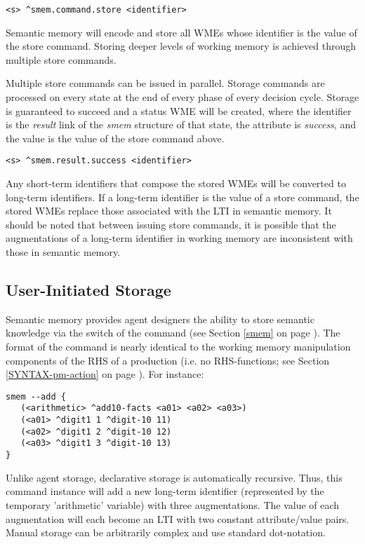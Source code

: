 \begin{verbatim}
<s> ^smem.command.store <identifier>
\end{verbatim}

Semantic memory will encode and store all WMEs whose identifier is the value of the store command.  
Storing deeper levels of working memory is achieved through multiple store commands.

Multiple store commands can be issued in parallel.  
Storage commands are processed on every state at the end of every phase of every decision cycle.  
Storage is guaranteed to succeed and a status WME will be created, where the identifier is the \emph{result} link of the \emph{smem} structure of that state, the attribute is \emph{success}, and the value is the value of the store command above.

\begin{verbatim}
<s> ^smem.result.success <identifier>
\end{verbatim}

Any short-term identifiers that compose the stored WMEs will be converted to long-term identifiers. 
If a long-term identifier is the value of a store command, the stored WMEs replace those associated with the LTI in semantic memory. 
It should be noted that between issuing store commands, it is possible that the augmentations of a long-term identifier in working memory are inconsistent with those in semantic memory.

\subsection{User-Initiated Storage}
Semantic memory provides agent designers the ability to store semantic knowledge via the  switch of the  command (see Section \ref{smem} on page \pageref{smem}).  
The format of the command is nearly identical to the working memory manipulation components of the RHS of a production (i.e. no RHS-functions; see Section \ref{SYNTAX-pm-action} on page \pageref{SYNTAX-pm-action}).  
For instance:

\begin{verbatim}
smem --add {
   (<arithmetic> ^add10-facts <a01> <a02> <a03>)
   (<a01> ^digit1 1 ^digit-10 11)
   (<a02> ^digit1 2 ^digit-10 12)
   (<a03> ^digit1 3 ^digit-10 13)
}
\end{verbatim}

Unlike agent storage, declarative storage is automatically recursive.  
Thus, this command instance will add a new long-term identifier (represented by the temporary 'arithmetic' variable) with three augmentations.  
The value of each augmentation will each become an LTI with two constant attribute/value pairs.  
Manual storage can be arbitrarily complex and use standard dot-notation.

